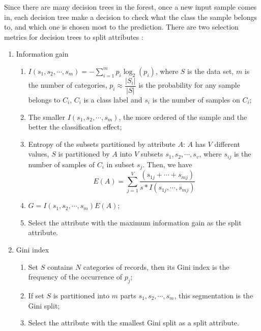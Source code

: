 \documentclass[sigconf]{acmart}
\begin{document}
Since there are many decision trees in the forest, once a new input sample comes in, each decision tree make a decision to check what the class the sample belongs to, and which one is chosen most to the prediction. There are two selection metrics for decision trees to split attributes \cite{intro.dm}:
\begin{enumerate}
    \item Information gain
    \begin{enumerate}
        \item $I(s_1,s_2,\cdots,s_m)=-\sum_{i=1}^{m}p_i\log_{2}(p_i)$, where $S$ is the data set, $m$ is the number of categories, $p_i \approx \dfrac{|S_i|}{|S|}$ is the probability for any sample belongs to $C_i$, $C_i$ is a class label and $s_i$ is the number of samples on $C_i$;
        \item The smaller $I(s_1,s_2,\cdots,s_m)$, the more ordered of the sample and the better the classification effect;
        \item Entropy of the subsets partitioned by attribute $A$: $A$ has $V$ different values, $S$ is partitioned by $A$ into $V$ subsets $s_1,s_2,\cdots,s_v$, where $s_{ij}$ is the number of samples of $C_i$ in subset $s_j$. Then, we have
        \[
            E(A)=\sum_{j=1}^{V} \dfrac{(s_{1j}+\cdots+s_{mj})}{s*I(s_{1j},\cdots,s_{mj})}
        \]
        \item $G=I(s_1,s_2,\cdots,s_m)E(A)$;
        \item Select the attribute with the maximum information gain as the split attribute.
    \end{enumerate}
    \item Gini index
    \begin{enumerate}
        \item Set $S$ contains $N$ categories of records, then its Gini index is the frequency of the occurrence of $p_j$;
        \item If set $S$ is partitioned into $m$ parts $s_1,s_2,\cdots,s_m$, this segmentation is the Gini split;
        \item Select the attribute with the smallest Gini split as a split attribute.
    \end{enumerate}
\end{enumerate}
\end{document}

